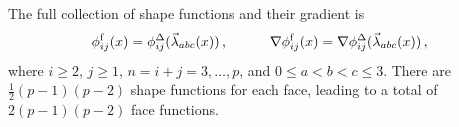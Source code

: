 The full collection of shape functions and their gradient is
\begin{equation}
	\phi_{ij}^\mathrm{f}(x)=\phi_{ij}^\Delta(\vec{\lambda}_{abc}(x))\,,\qquad\quad
			\nabla\phi_{ij}^\mathrm{f}(x)=\nabla\phi_{ij}^\Delta(\vec{\lambda}_{abc}(x))\,,
			\label{eq:H1Tetfaces}
\end{equation}
where $i\geq2$, $j\ge1$, $n=i+j=3,\ldots,p$, and $0\leq a<b<c\leq3$. 
There are $\frac{1}{2}(p-1)(p-2)$ shape functions for each face, leading to a total of $2(p-1)(p-2)$ face functions.



